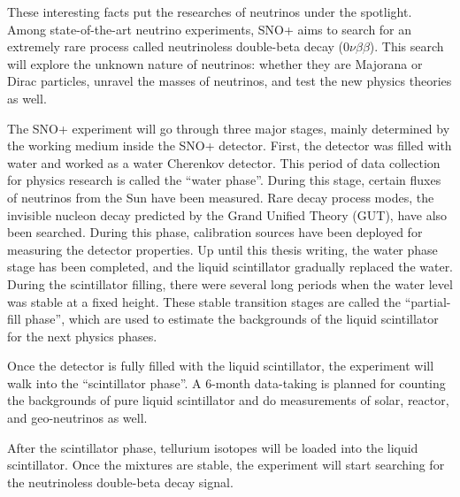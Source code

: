 These interesting facts put the researches of neutrinos under the spotlight. Among state-of-the-art neutrino experiments, SNO+ aims to search for an extremely rare process called neutrinoless double-beta decay ($0\nu\beta\beta$). This search will explore the unknown nature of neutrinos: whether they are Majorana or Dirac particles, unravel the masses of neutrinos, and test the new physics theories as well.

The SNO+ experiment will go through three major stages, mainly determined by the working medium inside the SNO+ detector. First, the detector was filled with water and worked as a water Cherenkov detector. This period of data collection for physics research is called the ``water phase''. During this stage, certain fluxes of neutrinos from the Sun have been measured. Rare decay process modes, the invisible nucleon decay predicted by the Grand Unified Theory (GUT), have also been searched. During this phase, calibration sources have been deployed for measuring the detector properties. Up until this thesis writing, the water phase stage has been completed, and the liquid scintillator gradually replaced the water.  During the scintillator filling, there were several long periods when the water level was stable at a fixed height. These stable transition stages are called the ``partial-fill phase'', which are used to estimate the backgrounds of the liquid scintillator for the next physics phases.

Once the detector is fully filled with the liquid scintillator, the experiment will walk into the ``scintillator phase''. A 6-month data-taking is planned for counting the backgrounds of pure liquid scintillator and do measurements of solar, reactor, and geo-neutrinos as well\cite{directorReview}. 

After the scintillator phase, tellurium isotopes will be loaded into the liquid scintillator. Once the mixtures are stable, the experiment will start searching for the neutrinoless double-beta decay signal.

